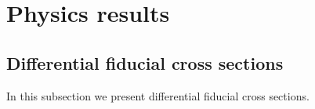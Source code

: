

\chapter{Physics results}\label{chap:physicsResults}

\section{Differential fiducial cross sections}

In this subsection we present differential fiducial cross sections.

